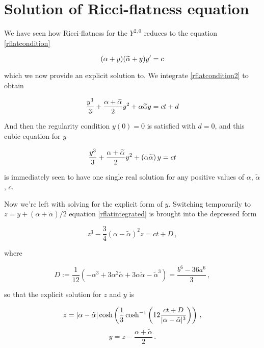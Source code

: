 \section{Solution of Ricci-flatness equation}\label{appendix:solutioncubic}

We have seen how Ricci-flatness for the $Y^{2,0}$ reduces to the equation \eqref{rflatcondition}

\begin{equation}\label{rflatcondition2}
	(\alpha+y)(\widetilde{\alpha} + y) y' = c
\end{equation}

which we now provide an explicit solution to. We integrate \eqref{rflatcondition2} to obtain

\begin{equation}
	\frac{y^3}{3} + \frac{\alpha + \widetilde{\alpha}}{2} y^2 + \alpha \widetilde{\alpha} y = ct + d \label{rflatintegrated}
\end{equation}

And then the regularity condition $y(0)=0$ is satisfied with $d=0$, and this cubic equation for $y$

\begin{equation}
	\frac{y^3}{3} + \frac{\alpha + \widetilde{\alpha}}{2} y^2 + (\alpha \widetilde{\alpha})\, y = ct
\end{equation}

is immediately seen to have one single real solution for any positive values of $\alpha$, $\tilde\alpha$, $c$.

Now we're left with solving for the explicit form of $y$. Switching temporarily to $z = y + (\alpha + \tilde\alpha)/2$ equation \eqref{rflatintegrated} is brought into the depressed form

\begin{equation}
	z^3 - \frac{3}4 (\alpha - \tilde\alpha)^2 z = ct + D\,,
	\label{depressed}
\end{equation}

where

\begin{equation}
	D := \frac{1}{12}(-\alpha^3 + 3 \alpha^2 \tilde\alpha + 3 \alpha\tilde{\alpha} - \tilde{\alpha}^3) = \frac{b^6-36a^6}{3}\,,
	\label{dprime}
\end{equation}

so that the explicit solution for $z$ and $y$ is

\begin{equation}
	z = |\alpha - \tilde \alpha| \cosh \left( \frac{1}{3} \cosh^{-1} \left( 12 \frac{ct + D}{|\alpha-\tilde\alpha|^3} \right) \right)  \,,
	\label{explicitz}
\end{equation}
\begin{equation}
	y = z - \frac{\alpha + \tilde{\alpha}}2 \,.
	\label{explicitY}
\end{equation}

